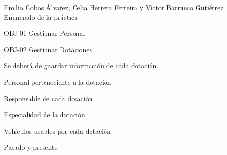 {Emilio Cobos Álvarez, Celia Herrera Ferreira y Víctor Barrueco Gutiérrez}
{Enunciado de la práctica}
{OBJ-01 Gestionar Personal \par
OBJ-02 Gestionar Dotaciones}
{}
{Se deberá de guardar información de cada dotación.}
{
\item{Personal perteneciente a la dotación}
\item{Responsable de cada dotación}
\item{Especialidad de la dotación}
\item{Vehículos usables por cada dotación}
}
{Pasado y presente}

